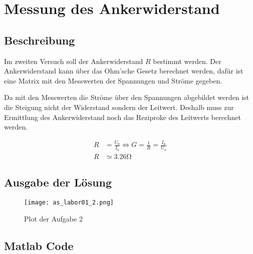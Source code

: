 \section{Messung des Ankerwiderstand}

\subsection{Beschreibung}

Im zweiten Versuch soll der Ankerwiderstand $R$ bestimmt werden.
Der Ankerwiderstand kann über das Ohm'sche Gesetz berechnet werden,
dafür ist eine Matrix mit den Messwerten der Spannungen und Ströme gegeben.

Da mit den Messwerten die Ströme über den Spannungen abgebildet werden ist die
Steigung nicht der Widerstand sondern der Leitwert. Deshalb muss zur Ermittlung
des Ankerwiderstand noch das Reziproke des Leitwerts berechnet werden.

\begin{equation} \label{eq121}
    \begin{split}
        R&=\frac{U_a}{I_a} \Leftrightarrow G=\frac{1}{R}=\frac{I_a}{U_a}\\
        R&\simeq 3.26 \mathrm{\Omega}
    \end{split}
\end{equation}

\subsection{Ausgabe der Lösung}
\begin{figure}[H]
 \centering
 \texttt{[image: as\_labor01\_2.png]}
 \caption{Plot der Aufgabe 2}
 \label{fig:PlotAufgabe2}
\end{figure}

\subsection{Matlab Code}

